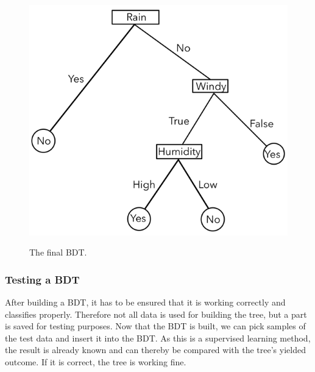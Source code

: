 \documentclass[
12pt,
headsepline,
bibliography=totoc,
twoside=semi,
fleqn
]{scrartcl}
\begin{document}
 
 \begin{figure}[H]
    \centering\includegraphics[scale=0.55]{BDT11.png}\label{fig:fig11}
    \caption{The final BDT.} 
 \end{figure}



 \subsubsection{Testing a BDT\label{sec:sec2-1-4}}
 After building a BDT, it has to be ensured that it is working correctly and classifies properly. Therefore not all data is used for building the tree, but a part is saved for testing purposes. Now that the BDT is built, we can pick samples of the test data and insert it into the BDT. As this is a supervised learning method, the result is already known and can thereby be compared with the tree's yielded outcome. If it is correct, the tree is working fine.  
\end{document}
